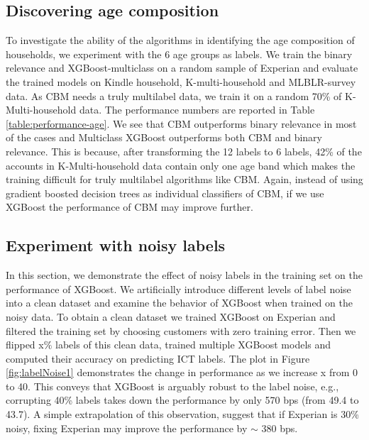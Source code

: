 \subsection{Discovering age composition}
To investigate the ability of the algorithms in identifying the age composition of households, we experiment with the 6 age groups as labels. We train the binary relevance and XGBoost-multiclass on a random sample of Experian and evaluate the trained models on Kindle household, K-multi-household and MLBLR-survey data. As CBM needs a truly multilabel data, we train it on a random 70\% of K-Multi-household data.   The performance numbers are reported in Table \ref{table:performance-age}. We see that CBM outperforms binary relevance in most of the cases and Multiclass XGBoost outperforms both CBM and binary relevance. This is because, after transforming the 12 labels to 6 labels, 42\% of the accounts in K-Multi-household data contain only one age band which makes the training difficult for truly multilabel algorithms like CBM.
Again, instead of using gradient boosted decision trees as individual classifiers of CBM, if we use XGBoost the performance of CBM may improve further.
%
%
\subsection{Experiment with noisy labels}
In this section, we demonstrate the effect of noisy labels in the training set on the performance of XGBoost. 
We artificially introduce different levels of label noise into a clean dataset and examine the behavior of XGBoost when trained on the noisy data. 
To obtain a clean dataset we trained XGBoost on Experian and filtered the training set by choosing customers with zero training error. Then we flipped x$\%$ labels of this clean data, trained multiple XGBoost models and computed their accuracy on predicting ICT labels. The plot in Figure \ref{fig:labelNoise1} demonstrates the change in performance as we increase x from 0 to 40. This conveys that XGBoost is arguably robust to the label noise, e.g., corrupting 40\% labels takes down the performance by only 570 bps (from 49.4 to 43.7). A simple extrapolation of this observation, suggest that if Experian is 30\% noisy, fixing Experian may improve the performance by $\sim$ 380 bps. 

